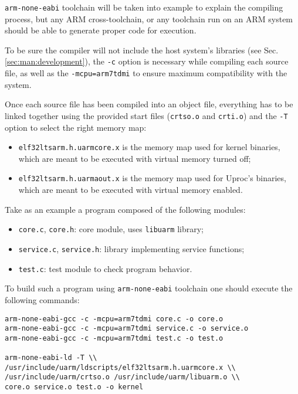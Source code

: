 
\texttt{arm-none-eabi} toolchain will be taken into example to explain the compiling process, but any ARM cross-toolchain, or any toolchain run on an ARM system should be able to generate proper code for \uarm{} execution.

To be sure the compiler will not include the host system's libraries (see Sec. \ref{sec:man:development}), the \texttt{-c} option is necessary while compiling each source file, as well as the \texttt{-mcpu=arm7tdmi} to ensure maximum compatibility with the system.

Once each source file has been compiled into an object file, everything has to be linked together using the provided start files (\texttt{crtso.o} and \texttt{crti.o}) and the \texttt{-T} option to select the right memory map:
\begin{itemize}
	\item \texttt{elf32ltsarm.h.uarmcore.x} is the memory map used for kernel binaries, which are meant to be executed with virtual memory turned off;
	\item \texttt{elf32ltsarm.h.uarmaout.x} is the memory map used for Uproc's binaries, which are meant to be executed with virtual memory enabled.
\end{itemize}

Take as an example a program composed of the following modules:
\begin{itemize}
	\item \texttt{core.c}, \texttt{core.h}: core module, uses \texttt{libuarm} library;
	\item \texttt{service.c}, \texttt{service.h}: library implementing service functions;
	\item \texttt{test.c}: test module to check program behavior.
\end{itemize}

To build such a program using \texttt{arm-none-eabi} toolchain one should execute the following commands:\\
\begin{minipage}{\textwidth}
\begin{lstlisting}
arm-none-eabi-gcc -c -mcpu=arm7tdmi core.c -o core.o
arm-none-eabi-gcc -c -mcpu=arm7tdmi service.c -o service.o
arm-none-eabi-gcc -c -mcpu=arm7tdmi test.c -o test.o

arm-none-eabi-ld -T \\
/usr/include/uarm/ldscripts/elf32ltsarm.h.uarmcore.x \\
/usr/include/uarm/crtso.o /usr/include/uarm/libuarm.o \\
core.o service.o test.o -o kernel
\end{lstlisting}
\end{minipage}

